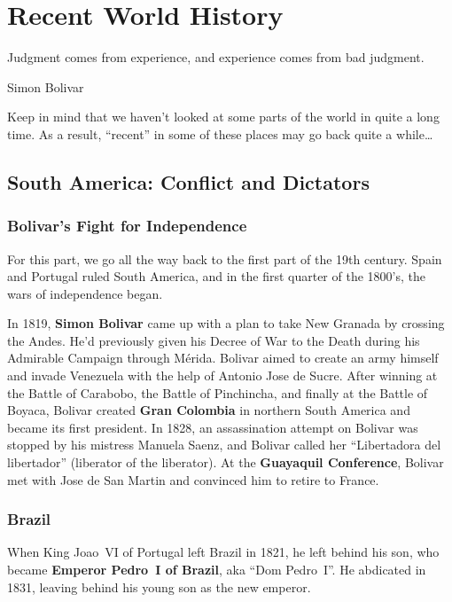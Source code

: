 \chapter{Recent World History}

\epigraph{%
  Judgment comes from experience, and experience comes from bad judgment.
}{Simon Bolivar}

Keep in mind that we haven't looked at some parts of the world in quite a long time.
As a result, ``recent'' in some of these places may go back quite a while\ldots{}

\section{South America: Conflict and Dictators}

\subsection*{Bolivar's Fight for Independence}

For this part, we go all the way back to the first part of the 19th century.
Spain and Portugal ruled South America, and in the first quarter of the 1800's, the wars of independence began.

In 1819, \textbf{Simon Bolivar} came up with a plan to take New Granada by crossing the Andes.
He'd previously given his Decree of War to the Death during his Admirable Campaign through M\'erida.
Bolivar aimed to create an army himself and invade Venezuela with the help of Antonio Jose de Sucre.
After winning at the Battle of Carabobo, the Battle of Pinchincha, and finally at the Battle of Boyaca,
Bolivar created \textbf{Gran Colombia} in northern South America and became its first president.
In 1828, an assassination attempt on Bolivar was stopped by his mistress Manuela Saenz,
and Bolivar called her ``Libertadora del libertador'' (liberator of the liberator).
At the \textbf{Guayaquil Conference}, Bolivar met with Jose de San Martin and convinced him to retire to France.

\subsection*{Brazil}

When King Joao~VI of Portugal left Brazil in 1821, he left behind his son,
who became \textbf{Emperor Pedro~I of Brazil}, aka ``Dom Pedro~I''.
He abdicated in 1831, leaving behind his young son as the new emperor.

